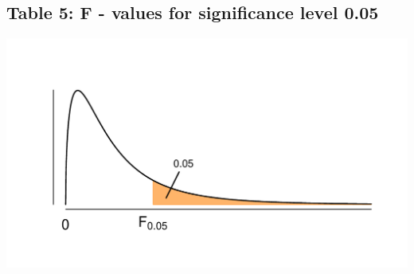 \subsection{Table 5: F - values for significance level 0.05}
\label{table5}

\vspace*{-30pt}
\begin{minipage}{0.6\textwidth}
\hfill
\end{minipage}
\begin{minipage}{0.4\textwidth}
\includegraphics[width=\textwidth]{Files/Images/fdist.pdf}
\end{minipage}

